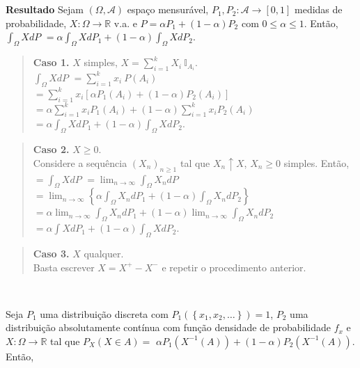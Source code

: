 \documentclass[
]{book}
\begin{document}
\(~\)

\(~\)

\textbf{Resultado} Sejam \((\Omega,\mathcal{A})\) espaço mensurável, \(P_1,P_2: \mathcal{A}\longrightarrow [0,1]\) medidas de probabilidade, \(X: \Omega \longrightarrow \mathbb{R}\) v.a. e \(P=\alpha P_1+(1-\alpha)P_2\) com \(0\leq\alpha\leq1\). Então,\\
\(\displaystyle\int_\Omega XdP\) \(=\displaystyle\alpha \int_\Omega XdP_1 + (1-\alpha)\int_\Omega XdP_2\).

\begin{quote}
\textbf{Caso 1.} \(X\) simples, \(X=\displaystyle\sum_{i=1}^kX_i~\mathbb{I}_{A_i}\).\\
\(\displaystyle\int_\Omega XdP\) \(=\displaystyle\sum_{i=1}^kx_i~P(A_i)\) \(=\displaystyle\sum_{i=1}^k x_i[\alpha P_1(A_i)+(1-\alpha)P_2(A_i)]\) \(=\displaystyle\alpha \sum_{i=1}^k x_iP_1(A_i)+(1-\alpha)\sum_{i=1}^k x_iP_2(A_i)\) \(=\displaystyle\alpha \int_\Omega XdP_1+(1-\alpha)\int_\Omega XdP_2\).
\end{quote}

\begin{quote}
\textbf{Caso 2.} \(X \geq 0\).\\
Considere a sequência \(\left(X_n\right)_{n\geq 1}\) tal que \(X_n \uparrow X\), \(X_n \geq 0\) simples. Então,\\
\(=\displaystyle\int_\Omega XdP\) \(=\displaystyle\lim_{n\rightarrow\infty}\int_\Omega X_n dP\) \(=\displaystyle\lim_{n\rightarrow\infty}\left\{\alpha\int_\Omega X_ndP_1+(1-\alpha)\int_\Omega X_ndP_2\right\}\) \(=\displaystyle\alpha\lim_{n\rightarrow\infty}\int_\Omega X_ndP_1 + (1-\alpha)\lim_{n\rightarrow\infty}\int_\Omega X_n dP_2\) \(=\displaystyle\alpha\int XdP_1 + (1-\alpha)\int_\Omega XdP_2\).
\end{quote}

\begin{quote}
\textbf{Caso 3.} \(X\) qualquer.\\
Basta escrever \(X=X^+-X^-\) e repetir o procedimento anterior.
\end{quote}

\(~\)

Seja \(P_1\) uma distribuição discreta com \(P_1\left(\left\{x_1,x_2,\ldots\right\}\right)=1\), \(P_2\) uma distribuição absolutamente contínua com função densidade de probabilidade \(f_x\) e \(X:\Omega \longrightarrow \mathbb{R}\) tal que \(P_X(X \in A)=\) \(\alpha P_1\left(X^{-1}(A)\right)+(1-\alpha)P_2\left(X^{-1}(A)\right)\). Então,
\end{document}
